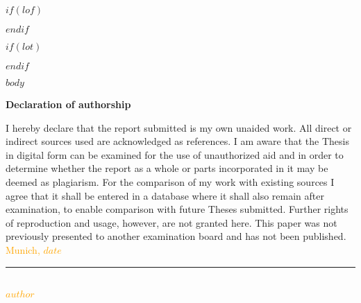 \documentclass[12pt]{article}
\begin{document}
$if(lof)$
\newpage
\listoffigures
{}
$endif$

$if(lot)$
\newpage
\listoftables
{}
$endif$

\newpage
\pagestyle{plain}
\setcounter{page}{1}    %

$body$



\Large
\noindent
\textbf{Declaration of authorship}
\vspace{0.5cm}
\noindent
\normalsize

I hereby declare that the report submitted is my own unaided work. All direct
or indirect sources used are acknowledged as references. I am aware that the
Thesis in digital form can be examined for the use of unauthorized aid and in
order to determine whether the report as a whole or parts incorporated in it may
be deemed as plagiarism. For the comparison of my work with existing sources I
agree that it shall be entered in a database where it shall also remain after
examination, to enable comparison with future Theses submitted. Further rights
of reproduction and usage, however, are not granted here. This paper was not
previously presented to another examination board and has not been published.
\\

\vspace{1cm}
\textcolor{orange}{Munich, $date$} \\

\vspace{3cm}

\noindent\rule{0.5\textwidth}{0.4pt} \\

\textcolor{orange}{$author$}

\end{document}
